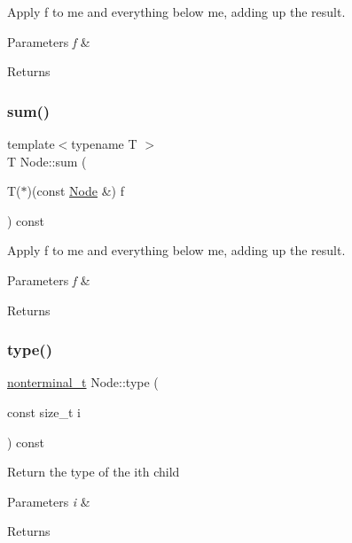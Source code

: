Apply f to me and everything below me, adding up the result. 
\begin{DoxyParams}{Parameters}
{\em f} & \\
\hline
\end{DoxyParams}
\begin{DoxyReturn}{Returns}

\end{DoxyReturn}
\mbox{\label{class_node_a089e99addd93f91b2ef5a9d0c3e6bdeb}} 
\subsubsection{\texorpdfstring{sum()}{sum()}\hspace{0.1cm}{\footnotesize\ttfamily [2/2]}}
{\footnotesize\ttfamily template$<$typename T $>$ \\
T Node\+::sum (\begin{DoxyParamCaption}\item[{T($\ast$)(const \hyperlink{class_node}{Node} \&)}]{f }\end{DoxyParamCaption}) const\hspace{0.3cm}{\ttfamily [inline]}}

Apply f to me and everything below me, adding up the result. 
\begin{DoxyParams}{Parameters}
{\em f} & \\
\hline
\end{DoxyParams}
\begin{DoxyReturn}{Returns}

\end{DoxyReturn}
\mbox{\label{class_node_aa727c354e38f60fb1560d72ae1aaa9af}} 
\subsubsection{\texorpdfstring{type()}{type()}}
{\footnotesize\ttfamily \hyperlink{_nonterminal_8h_a5c1f658dc7560600a16d22408bd716ca}{nonterminal\+\_\+t} Node\+::type (\begin{DoxyParamCaption}\item[{const size\+\_\+t}]{i }\end{DoxyParamCaption}) const\hspace{0.3cm}{\ttfamily [inline]}}

Return the type of the i\textquotesingle{}th child 
\begin{DoxyParams}{Parameters}
{\em i} & \\
\hline
\end{DoxyParams}
\begin{DoxyReturn}{Returns}

\end{DoxyReturn}


